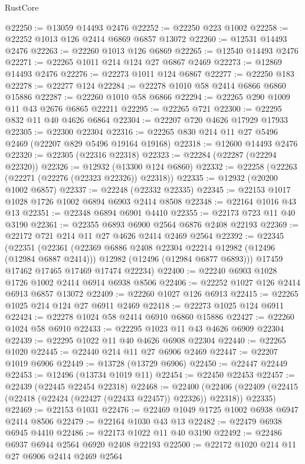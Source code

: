\begin{lexlean}{RustCore}
\begin{coremodule}
@22250 := @13059 @14493 @2476
@22252 := @22250 @223 @1002
@22258 := @22252 @1013 @126 @2414 @6869 @6857 @13072
@22260 := @12531 @14493 @2476
@22263 := @22260 @1013 @126 @6869
@22265 := @12540 @14493 @2476
@22271 := @22265 @1011 @214 @124 @27 @6867 @2469
@22273 := @12869 @14493 @2476
@22276 := @22273 @1011 @124 @6867
@22277 := @22250 @183
@22278 := @22277 @124
@22284 := @22278 @1010 @58 @2414 @6866 @6860 @15886
@22287 := @22260 @1010 @58 @6866
@22294 := @22265 @290 @1009 @11 @43 @2676 @6865 @22211
@22295 := @22265 @721
@22300 := @22295 @832 @11 @40 @4626 @6864
@22304 := @22207 @720 @4626 @17929 @17933
@22305 := @22300 @22304
@22316 := @22265 @830 @214 @11 @27 @5496 @2469 (@22207 @829 @5496 @19164 @19168)
@22318 := @12600 @14493 @2476
@22320 := @22305 (@22316 @22318)
@22323 := @22284 (@22287 (@22294 @22320))
@22326 := @12932 (@13300 @124 @6860)
@22332 := @22258 (@22263 (@22271 (@22276 (@22323 @22326)) @22318))
@22335 := @12932 (@20200 @1002 @6857)
@22337 := @22248 (@22332 @22335)
@22345 := @22153 @1017 @1028 @1726 @1002 @6894 @6903 @2414 @8508
@22348 := @22164 @1016 @43 @13
@22351 := @22348 @6894 @6901 @4410
@22355 := @22173 @723 @11 @40 @3190
@22361 := @22355 @6893 @6900 @2564 @6876 @2408 @22193
@22369 := @22172 @721 @214 @11 @27 @4626 @2414 @2469 @2564
@22392 := @22345
    (@22351
      (@22361
        (@22369 @6886 @2408 @22304 @22214 @12982 (@12496 (@12984 @6887 @2414)))
        @12982
        (@12496 (@12984 @6877 @6893)))
      @17459
      @17462
      @17465
      @17469
      @17474
      @22234)
@22400 := @22240 @6903 @1028 @1726 @1002 @2414 @6914 @6938 @8506
@22406 := @22252 @1027 @126 @2414 @6913 @6857 @13072
@22409 := @22260 @1027 @126 @6913
@22415 := @22265 @1025 @214 @124 @27 @6911 @2469
@22418 := @22273 @1025 @124 @6911
@22424 := @22278 @1024 @58 @2414 @6910 @6860 @15886
@22427 := @22260 @1024 @58 @6910
@22433 := @22295 @1023 @11 @43 @4626 @6909 @22304
@22439 := @22295 @1022 @11 @40 @4626 @6908 @22304
@22440 := @22265 @1020
@22445 := @22440 @214 @11 @27 @6906 @2469
@22447 := @22207 @1019 @6906
@22449 := @13728 (@13729 @6906)
@22450 := @22447 @22449
@22453 := @12496 (@13734 @1019 @11)
@22454 := @22450 @22453
@22457 := @22439 (@22445 @22454 @22318)
@22468 := @22400
    (@22406 (@22409 (@22415 (@22418 (@22424 (@22427 (@22433 @22457)) @22326)) @22318)) @22335)
@22469 := @22153 @1031
@22476 := @22469 @1049 @1725 @1002 @6938 @6947 @2414 @8506
@22479 := @22164 @1030 @43 @13
@22482 := @22479 @6938 @6945 @4410
@22486 := @22173 @1022 @11 @40 @3190
@22492 := @22486 @6937 @6944 @2564 @6920 @2408 @22193
@22500 := @22172 @1020 @214 @11 @27 @6906 @2414 @2469 @2564

\end{coremodule}
\end{lexlean}
